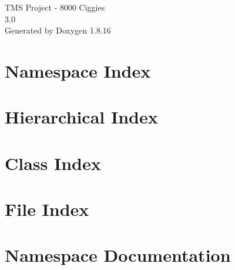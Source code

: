 \let\mypdfximage\pdfximage\def\pdfximage{\immediate\mypdfximage}\documentclass[twoside]{book}
\newcommand{\+}{\discretionary{\mbox{\scriptsize$\hookleftarrow$}}{}{}}
\newcommand{\clearemptydoublepage}{%
  \newpage{\pagestyle{empty}\cleardoublepage}%
}
\begin{document}
\hypersetup{pageanchor=false,
             bookmarksnumbered=true,
             pdfencoding=unicode
            }
\begin{titlepage}
\vspace*{7cm}
\begin{center}%
{\Large T\+MS Project -\/ 8000 Ciggies \\[1ex]\large 3.\+0 }\\
\vspace*{1cm}
{\large Generated by Doxygen 1.8.16}\\
\end{center}
\end{titlepage}
\clearemptydoublepage
{}
\tableofcontents
\clearemptydoublepage
{}
\hypersetup{pageanchor=true}

\chapter{Namespace Index}

\chapter{Hierarchical Index}

\chapter{Class Index}

\chapter{File Index}

\chapter{Namespace Documentation}


\end{document}
